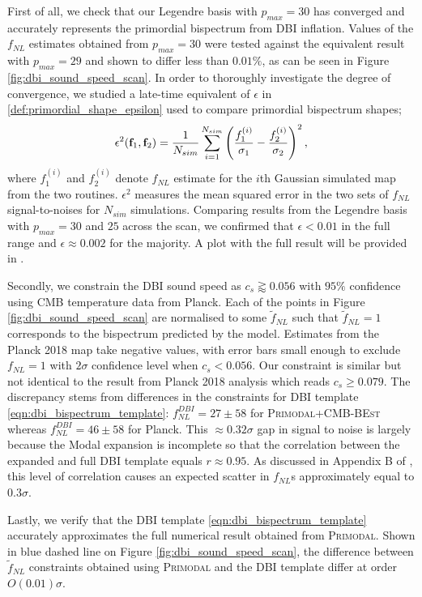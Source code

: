 First of all, we check that our Legendre basis with $p_{max}=30$ has converged and accurately represents the primordial bispectrum from DBI inflation. Values of the $f_{NL}$ estimates obtained from $p_{max}=30$ were tested against the equivalent result with $p_{max}=29$ and shown to differ less than $0.01\%$, as can be seen in Figure \ref{fig:dbi_sound_speed_scan}. In order to thoroughly investigate the degree of convergence, we studied a late-time equivalent of $\epsilon$ in  \eqref{def:primordial_shape_epsilon} used to compare primordial bispectrum shapes;
\begin{align}
	\epsilon^2 (\mathbf{f}_1, \mathbf{f}_2) = \frac{1}{N_{sim}}  \sum_{i=1}^{N_{sim}} \left( \frac{f^{(i)}_1}{\sigma_1} - \frac{f^{(i)}_2}{\sigma_2} \right)^2,
\end{align}
where $f^{(i)}_1$ and $f^{(i)}_2$ denote $f_{NL}$ estimate for the $i$th Gaussian simulated map from the two routines. $\epsilon^2$ measures the mean squared error in the two sets of $f_{NL}$ signal-to-noises for $N_{sim}$ simulations. Comparing results from the Legendre basis with $p_{max} = 30$ and $25$ across the scan, we confirmed that $\epsilon < 0.01$ in the full range and $\epsilon \approx 0.002$ for the majority. A plot with the full result will be provided in \cite{Sohn2021inprep}.

Secondly, we constrain the DBI sound speed as $c_s \gtrapprox 0.056$ with $95\%$ confidence using CMB temperature data from Planck. Each of the points in Figure \ref{fig:dbi_sound_speed_scan} are normalised to some $\tilde{f}_{NL}$ such that $\tilde{f}_{NL}=1$ corresponds to the bispectrum predicted by the model. Estimates from the Planck 2018 map take negative values, with error bars small enough to exclude $f_{NL}=1$ with $2\sigma$ confidence level when $c_s < 0.056$. Our constraint is similar but not identical to the result from Planck 2018 analysis which reads $c_s \ge 0.079$. The discrepancy stems from differences in the constraints for DBI template \eqref{eqn:dbi_bispectrum_template}: $f^{DBI}_{NL}=27 \pm 58$ for \textsc{Primodal}+\textsc{CMB-BEst} whereas $f^{DBI}_{NL}=46 \pm 58$ for Planck. This $\approx0.32\sigma$ gap in signal to noise is largely because the Modal expansion is incomplete so that the correlation between the expanded and full DBI template equals $r\approx 0.95$. As discussed in Appendix B of \cite{PlanckCollaboration2013}, this level of correlation causes an expected scatter in $f_{NL}$s approximately equal to $0.3\sigma$.

Lastly, we verify that the DBI template \eqref{eqn:dbi_bispectrum_template} accurately approximates the full numerical result obtained from \textsc{Primodal}. Shown in blue dashed line on Figure \ref{fig:dbi_sound_speed_scan}, the difference between $\tilde{f}_{NL}$ constraints obtained using \textsc{Primodal} and the DBI template differ at order $O(0.01)\sigma$.

